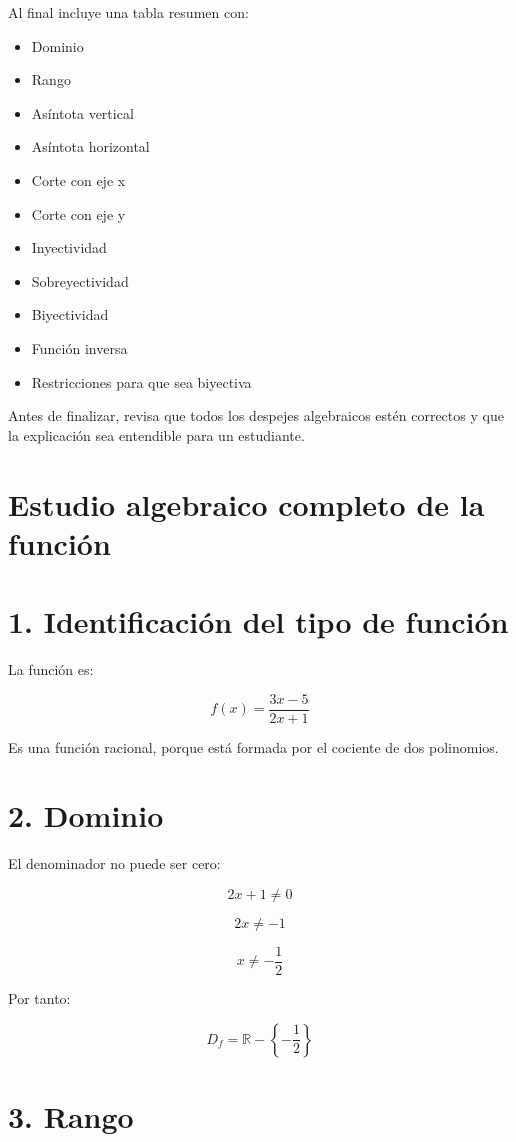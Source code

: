 \documentclass[12pt,a4paper]{article}
\begin{document}
	Al final incluye una tabla resumen con:
	
	\begin{itemize}
		\item Dominio
		\item Rango
		\item Asíntota vertical
		\item Asíntota horizontal
		\item Corte con eje x
		\item Corte con eje y
		\item Inyectividad
		\item Sobreyectividad
		\item Biyectividad
		\item Función inversa
		\item Restricciones para que sea biyectiva
	\end{itemize}
	
	Antes de finalizar, revisa que todos los despejes algebraicos estén correctos y que la explicación sea entendible para un estudiante.
	
	\newpage
	
	\section*{Estudio algebraico completo de la función}
	
	\section*{1. Identificación del tipo de función}
	
	La función es:
	
	\[
	f(x)=\frac{3x-5}{2x+1}
	\]
	
	Es una función racional, porque está formada por el cociente de dos polinomios.
	
	\section*{2. Dominio}
	
	El denominador no puede ser cero:
	
	\[
	2x+1\neq 0
	\]
	
	\[
	2x\neq -1
	\]
	
	\[
	x\neq -\frac{1}{2}
	\]
	
	Por tanto:
	
	\[
	D_f=\mathbb{R}-\left\{-\frac{1}{2}\right\}
	\]
	
	\section*{3. Rango}
	
\end{document}
